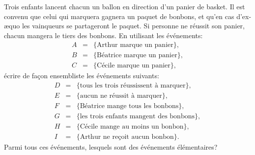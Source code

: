 \documentclass[a4paper,12pt,reqno]{amsart}
\begin{document}


\begin{exo}

  Trois enfants lancent chacun un ballon en direction d'un panier de basket. Il est convenu que celui qui marquera gagnera un paquet de bonbons, et qu'en cas d'ex-æquo les vainqueurs se partageront le paquet. Si personne ne réussit son panier, chacun mangera le tiers des bonbons. En utilisant les événements:
  \begin{eqnarray*}
    A & = & \{\text{Arthur marque un panier}\},\\
    B & = & \{\text{Béatrice marque un panier}\},\\
    C & = & \{\text{Cécile marque un panier}\},
  \end{eqnarray*}
  écrire de façon ensembliste les événements suivants:
  \begin{eqnarray*}
    D & = & \{\text{tous les trois réussissent à marquer}\},\\
    E & = & \{\text{aucun ne réussit à marquer}\},\\
    F & = & \{\text{Béatrice mange tous les bonbons}\},\\
    G & = & \{\text{les trois enfants mangent des bonbons}\},\\
    H & = & \{\text{Cécile mange au moins un bonbon}\},\\
    I & = & \{\text{Arthur ne reçoit aucun bonbon}\}.
  \end{eqnarray*}
  Parmi tous ces événements, lesquels sont des événements élémentaires?

\end{exo}
\end{document}
